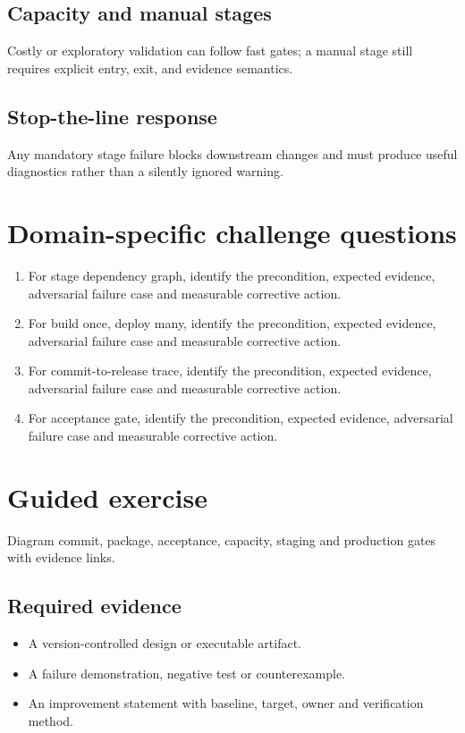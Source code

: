 \documentclass[10pt,letterpaper]{article}
\begin{document}
\subsection{Capacity and manual stages}
Costly or exploratory validation can follow fast gates; a manual stage still requires explicit entry, exit, and evidence semantics.

\subsection{Stop-the-line response}
Any mandatory stage failure blocks downstream changes and must produce useful diagnostics rather than a silently ignored warning.

\section{Domain-specific challenge questions}
\begin{enumerate}
\item For stage dependency graph, identify the precondition, expected evidence, adversarial failure case and measurable corrective action.
\item For build once, deploy many, identify the precondition, expected evidence, adversarial failure case and measurable corrective action.
\item For commit-to-release trace, identify the precondition, expected evidence, adversarial failure case and measurable corrective action.
\item For acceptance gate, identify the precondition, expected evidence, adversarial failure case and measurable corrective action.
\end{enumerate}
\section{Guided exercise}
Diagram commit, package, acceptance, capacity, staging and production gates with evidence links.

\subsection{Required evidence}
\begin{itemize}
\item A version-controlled design or executable artifact.
\item A failure demonstration, negative test or counterexample.
\item An improvement statement with baseline, target, owner and verification method.
\end{itemize}
\end{document}
